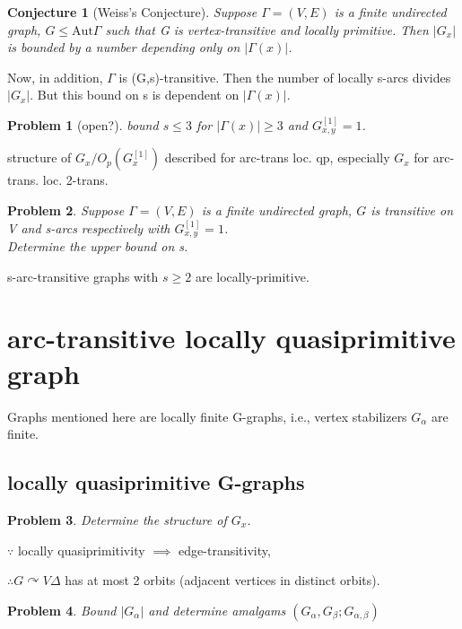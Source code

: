 \documentclass[a4paper,11pt,openany]{book}
\newtheorem{conjecture}{Conjecture}[section]
\newtheorem{problem}{Problem}[section]
\def\Aut{\mathrm{Aut}}
\begin{document}
\begin{conjecture}[Weiss's Conjecture]
	Suppose $\Gamma = (V, E)$ is a finite undirected graph, $G\leq \Aut\Gamma$ such that G
is vertex-transitive and locally primitive. Then $|G_x|$ is bounded by a number depending only on $|\Gamma(x)|$.
\end{conjecture}

Now, in addition, $\Gamma$ is (G,s)-transitive. Then the number of locally s-arcs divides $|G_x|$. But this bound on s is dependent on $|\Gamma(x)|$.

\begin{problem}[open?]
	bound $s\leq 3$ for $|\Gamma(x)|\geq 3$ and $G_{x,y}^{[1]}=1$.
\end{problem}


structure of $G_x/O_p(G_x^{[1]})$ described for arc-trans loc. qp, especially $G_x$ for arc-trans. loc. 2-trans.

\begin{problem}
	Suppose $\Gamma = (V, E)$ is a finite undirected graph, $G$ is transitive on V and s-arcs respectively with $G_{x,y}^{[1]}=1$.\\Determine the upper bound on s.
\end{problem}

s-arc-transitive graphs with $s\geq 2$ are locally-primitive.


\section{arc-transitive locally quasiprimitive graph}

Graphs mentioned here are locally finite G-graphs, i.e., vertex stabilizers $G_\alpha$ are finite.

\subsection{locally quasiprimitive G-graphs}
\begin{problem}
	Determine the structure of $G_x$.
\end{problem}

$\because$ locally quasiprimitivity $\implies$ edge-transitivity, 

$\therefore G\curvearrowright V\Delta$ has at most 2 orbits (adjacent vertices in distinct orbits).

\begin{problem}
	Bound $|G_\alpha|$ and determine amalgams $(G_\alpha,G_\beta;G_{\alpha,\beta})$
\end{problem}
\end{document}
